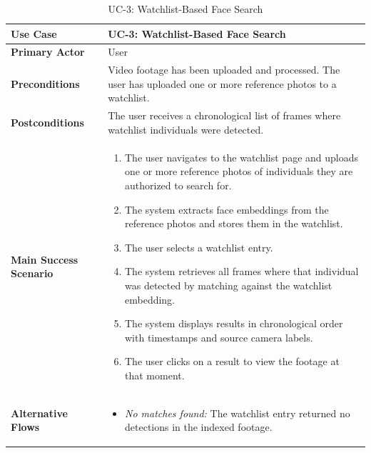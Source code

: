 \begin{table}[H]
\centering
\begin{tabular}{|l|p{10cm}|}
\hline
\textbf{Use Case}       & UC-3: Watchlist-Based Face Search \\ \hline
\textbf{Primary Actor}   & User \\ \hline
\textbf{Preconditions}   & Video footage has been uploaded and processed. The user has uploaded one or more reference photos to a watchlist. \\ \hline
\textbf{Postconditions}  & The user receives a chronological list of frames where watchlist individuals were detected. \\ \hline
\textbf{Main Success Scenario} &
    \begin{enumerate}[nosep, leftmargin=*]
        \item The user navigates to the watchlist page and uploads one or more reference photos of individuals they are authorized to search for.
        \item The system extracts face embeddings from the reference photos and stores them in the watchlist.
        \item The user selects a watchlist entry.
        \item The system retrieves all frames where that individual was detected by matching against the watchlist embedding.
        \item The system displays results in chronological order with timestamps and source camera labels.
        \item The user clicks on a result to view the footage at that moment.
    \end{enumerate} \\ \hline
\textbf{Alternative Flows} &
    \begin{itemize}[nosep, leftmargin=*]
        \item \textit{No matches found:} The watchlist entry returned no detections in the indexed footage.
    \end{itemize} \\ \hline
\end{tabular}
\caption{UC-3: Watchlist-Based Face Search}
\label{tab:uc3}
\end{table}

